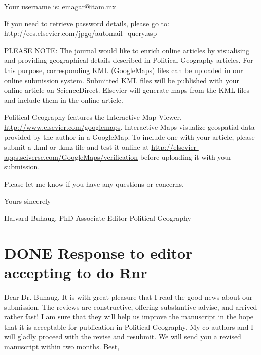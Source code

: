 \documentclass{article}
\begin{document}
Your username is: emagar@itam.mx

If you need to retrieve password details, please go to:
\url{http://ees.elsevier.com/jpgq/automail_query.asp}

PLEASE NOTE: The journal would like to enrich online articles by visualising and providing geographical details described in Political Geography articles. For this purpose, corresponding KML (GoogleMaps) files can be uploaded in our online submission system. Submitted KML files will be published with your online article on ScienceDirect. Elsevier will generate maps from the KML files and include them in the online article.

Political Geography features the Interactive Map Viewer, \url{http://www.elsevier.com/googlemaps}. Interactive Maps visualize geospatial data provided by the author in a GoogleMap. To include one with your article, please submit a .kml or .kmz file and test it online at \url{http://elsevier-apps.sciverse.com/GoogleMaps/verification} before uploading it with your submission.

Please let me know if you have any questions or concerns.

Yours sincerely

Halvard Buhaug, PhD
Associate Editor
Political Geography

\section{{\bfseries\sffamily DONE} Response to editor accepting to do Rnr}
\label{sec:orgheadline48}
Dear Dr. Buhaug, 
It is with great pleasure that I read the good news about our submission. The reviews are constructive, offering substantive advise, and arrived rather fast! I am sure that they will help us improve the manuscript in the hope that it is acceptable for publication in Political Geography. My co-authors and I will gladly proceed with the revise and resubmit. We will send you a revised manuscript within two months. 
Best,
\end{document}

